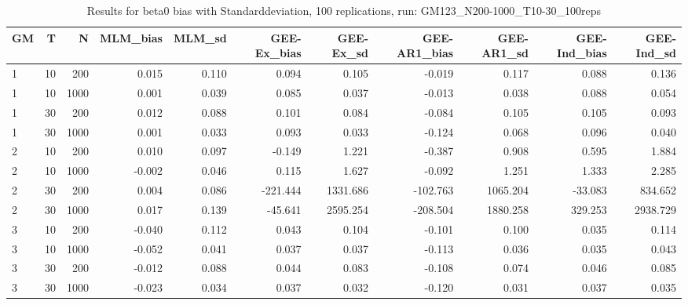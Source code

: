 \begin{table}[ht]
\centering
\begin{tabular}{lrrrrrrrrrr}
  \hline
GM & T & N & MLM\_bias & MLM\_sd & GEE-Ex\_bias & GEE-Ex\_sd & GEE-AR1\_bias & GEE-AR1\_sd & GEE-Ind\_bias & GEE-Ind\_sd \\ 
  \hline
1 & 10 & 200 & 0.015 & 0.110 & 0.094 & 0.105 & -0.019 & 0.117 & 0.088 & 0.136 \\ 
  1 & 10 & 1000 & 0.001 & 0.039 & 0.085 & 0.037 & -0.013 & 0.038 & 0.088 & 0.054 \\ 
  1 & 30 & 200 & 0.012 & 0.088 & 0.101 & 0.084 & -0.084 & 0.105 & 0.105 & 0.093 \\ 
  1 & 30 & 1000 & 0.001 & 0.033 & 0.093 & 0.033 & -0.124 & 0.068 & 0.096 & 0.040 \\ 
  2 & 10 & 200 & 0.010 & 0.097 & -0.149 & 1.221 & -0.387 & 0.908 & 0.595 & 1.884 \\ 
  2 & 10 & 1000 & -0.002 & 0.046 & 0.115 & 1.627 & -0.092 & 1.251 & 1.333 & 2.285 \\ 
   \hline
2 & 30 & 200 & 0.004 & 0.086 & -221.444 & 1331.686 & -102.763 & 1065.204 & -33.083 & 834.652 \\ 
  2 & 30 & 1000 & 0.017 & 0.139 & -45.641 & 2595.254 & -208.504 & 1880.258 & 329.253 & 2938.729 \\ 
  3 & 10 & 200 & -0.040 & 0.112 & 0.043 & 0.104 & -0.101 & 0.100 & 0.035 & 0.114 \\ 
  3 & 10 & 1000 & -0.052 & 0.041 & 0.037 & 0.037 & -0.113 & 0.036 & 0.035 & 0.043 \\ 
  3 & 30 & 200 & -0.012 & 0.088 & 0.044 & 0.083 & -0.108 & 0.074 & 0.046 & 0.085 \\ 
  3 & 30 & 1000 & -0.023 & 0.034 & 0.037 & 0.032 & -0.120 & 0.031 & 0.037 & 0.035 \\ 
   \hline
\end{tabular}
\caption{Results for beta0 bias with Standarddeviation, 100 replications, run: GM123_N200-1000_T10-30_100reps} 
\label{tab:beta0_bias_sd}
\end{table}
